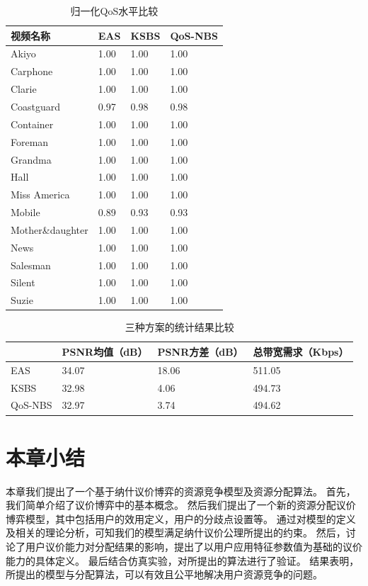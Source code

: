 \begin{table}[htbp]
    \wuhao
    \centering
    \caption{归一化QoS水平比较}
    \begin{tabular*}{\textwidth}{ p{} p{} p{} p{} }
        \toprule
     视频名称&   EAS& KSBS & QoS-NBS \\
     \midrule
Akiyo           	 & 1.00 & 1.00  &1.00\\ 
Carphone        	 & 1.00 & 1.00  &1.00\\ 
Clarie          	 & 1.00 & 1.00  &1.00\\ 
Coastguard      	 & 0.97 & 0.98  &0.98\\ 
Container       	 & 1.00 & 1.00  &1.00\\ 
Foreman         	 & 1.00 & 1.00  &1.00\\ 
Grandma         	 & 1.00 & 1.00  &1.00\\ 
Hall            	 & 1.00 & 1.00  &1.00\\ 
Miss America    	 & 1.00 & 1.00  &1.00\\ 
Mobile          	 & 0.89 & 0.93  &0.93\\ 
Mother\&daughter	 & 1.00 & 1.00  &1.00\\ 
News            	 & 1.00 & 1.00  &1.00\\ 
Salesman        	 & 1.00 & 1.00  &1.00\\ 
Silent          	 & 1.00 & 1.00  &1.00\\ 
Suzie           	 & 1.00 & 1.00  &1.00\\ 
\bottomrule
    \end{tabular*}
    \label{tab:chap_nash:qos_3_schemes}
\end{table}


\begin{table}[htbp]
    \wuhao
    \centering
    \caption{三种方案的统计结果比较}
    \begin{tabular*}{\textwidth}{ p{}p{}p{}p{}}
        \toprule
        & PSNR均值（dB） &PSNR方差（dB） &总带宽需求（Kbps） \\
        \midrule
        EAS & 34.07 & 18.06 & 511.05 \\
        KSBS &32.98 & 4.06 & 494.73 \\
        QoS-NBS & 32.97 & 3.74 & 494.62 \\
        \bottomrule
    \end{tabular*}
    \label{tab:chap_nash:statis_three_schemes}
\end{table}

\section{本章小结}
本章我们提出了一个基于纳什议价博弈的资源竞争模型及资源分配算法。
首先，我们简单介绍了议价博弈中的基本概念。
然后我们提出了一个新的资源分配议价博弈模型，其中包括用户的效用定义，用户的分歧点设置等。
通过对模型的定义及相关的理论分析，可知我们的模型满足纳什议价公理所提出的约束。
然后，讨论了用户议价能力对分配结果的影响，提出了以用户应用特征参数值为基础的议价能力的具体定义。
最后结合仿真实验，对所提出的算法进行了验证。
结果表明，所提出的模型与分配算法，可以有效且公平地解决用户资源竞争的问题。


